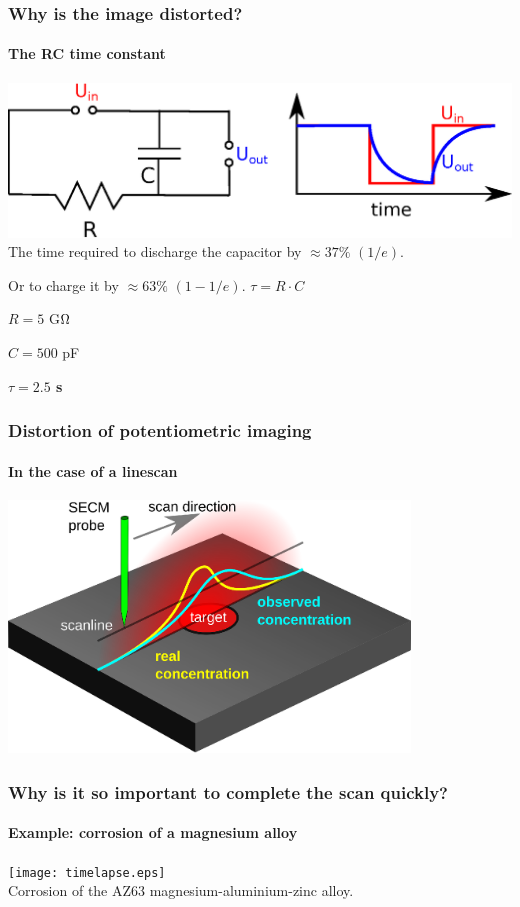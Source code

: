 \documentclass{beamer}
\begin{document}
\begin{frame}
	\frametitle{Why is the image distorted?}
	\framesubtitle{The RC time constant} 
	\centering
	\includegraphics[width=1\textwidth]{RC.eps}
	\vfill
	The time required to discharge the capacitor by $\approx 37\%$ $(1/e)$.
	
	Or to charge it by $\approx 63\%$ $(1-1/e)$.	
	\vfill
	$\tau = R \cdot C$
	
	$R = 5 $ G$\ohm$
	
	$C = 500 $ pF
	
	\textbf{\textcolor{white!100}{\colorbox{red!100}{$\tau = 2.5 $ s}}}

\end{frame}

\begin{frame}
	\frametitle{Distortion of potentiometric imaging} 
	\framesubtitle{In the case of a linescan} 
	\centering
	\includegraphics[width=0.8\textwidth]{distortion2.eps}
\end{frame}

\begin{frame}
	\frametitle{Why is it so important to complete the scan quickly?}
	\framesubtitle{Example: corrosion of a magnesium alloy}
	\texttt{[image: timelapse.eps]}\\
\centering
Corrosion of the AZ63 magnesium-aluminium-zinc alloy.
\end{frame} 
\end{document}
